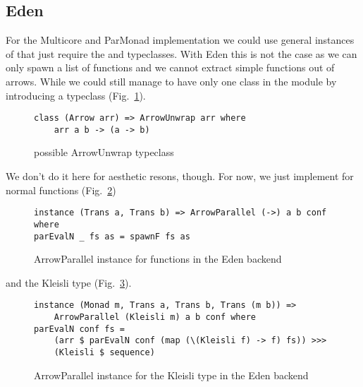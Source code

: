 \subsection{Eden}
For the Multicore and ParMonad implementation we could use general instances of  that just require the  and  typeclasses. With Eden this is not the case as we can only spawn a list of functions and we cannot extract simple functions out of arrows. While we could still manage to have only one class in the module by introducing a typeclass  (Fig.~\ref{fig:ArrowUnwrap}).
\begin{figure}[h]
\begin{lstlisting}[frame=htrbl]
class (Arrow arr) => ArrowUnwrap arr where
	arr a b -> (a -> b)
\end{lstlisting}
\caption{possible ArrowUnwrap typeclass}
\label{fig:ArrowUnwrap}
\end{figure}
We don't do it here for aesthetic resons, though. For now, we just implement  for normal functions (Fig.~\ref{fig:ArrowParallelEdenFns})
\begin{figure}[h]
\begin{lstlisting}[frame=htrbl]
instance (Trans a, Trans b) => ArrowParallel (->) a b conf where
parEvalN _ fs as = spawnF fs as
\end{lstlisting}
\caption{ArrowParallel instance for functions in the Eden backend}
\label{fig:ArrowParallelEdenFns}
\end{figure}
and the Kleisli type (Fig.~\ref{fig:ArrowParallelEdenKleisli}).
\begin{figure}[h]
\begin{lstlisting}[frame=htrbl]
instance (Monad m, Trans a, Trans b, Trans (m b)) =>
	ArrowParallel (Kleisli m) a b conf where
parEvalN conf fs =
	(arr $ parEvalN conf (map (\(Kleisli f) -> f) fs)) >>>
	(Kleisli $ sequence)
\end{lstlisting}
\caption{ArrowParallel instance for the Kleisli type in the Eden backend}
\label{fig:ArrowParallelEdenKleisli}
\end{figure}

